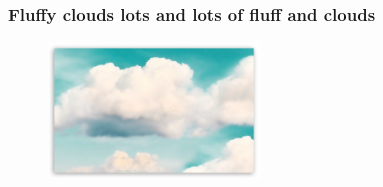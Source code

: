 \begin{frame}[fragile]
\frametitle{Fluffy clouds lots and lots of fluff and clouds}
\begin{figure}
\includegraphics[width=0.5\textwidth,natwidth=510,natheight=330]{res/image/fluffy-clouds.jpg}
\end{figure}
\end{frame}
